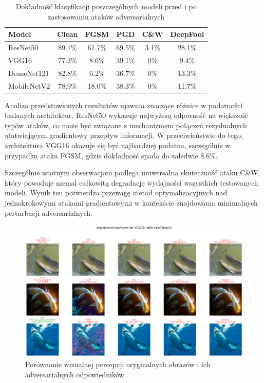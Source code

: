 \documentclass[12pt]{article}
\begin{document}
\begin{table}[H]
    \centering
    \begin{tabular}{|l|c|c|c|c|c|}
    \hline
    \textbf{Model} & \textbf{Clean} & \textbf{FGSM} & \textbf{PGD} & \textbf{C\&W} & \textbf{DeepFool} \\
    \hline
    ResNet50 & 89.1\% & 61.7\% & 69.5\% & 3.1\% & 28.1\% \\
    VGG16 & 77.3\% & 8.6\% & 39.1\% & 0\% & 9.4\% \\
    DenseNet121 & 82.8\% & 6.2\% & 36.7\% & 0\% & 13.3\% \\
    MobileNetV2 & 78.9\% & 18.0\% & 38.3\% & 0\% & 11.7\% \\
    \hline
    \end{tabular}
    \caption{Dokładność klasyfikacji poszczególnych modeli przed i po zastosowaniu ataków adversarialnych}
    \label{tab:attack-results}
\end{table}

Analiza przedstawionych rezultatów ujawnia znaczące różnice w podatności badanych architektur. ResNet50 wykazuje najwyższą odporność na większość typów ataków, co może być związane z mechanizmem połączeń rezydualnych ułatwiającym gradientowy przepływ informacji. W przeciwieństwie do tego, architektura VGG16 okazuje się być najbardziej podatna, szczególnie w przypadku ataku FGSM, gdzie dokładność spada do zaledwie 8.6\%.

Szczególnie istotnym obserwacjom podlega uniwersalna skuteczność ataku C\&W, który powoduje niemal całkowitą degradację wydajności wszystkich testowanych modeli. Wynik ten potwierdza przewagę metod optymalizacyjnych nad jednokrokowymi atakami gradientowymi w kontekście znajdowania minimalnych perturbacji adversarialnych.

\begin{figure}[H]
    \centering
    \includegraphics[width=1\textwidth]{adversarial_examples.png}
    \caption{Porównanie wizualnej percepcji oryginalnych obrazów i ich adversarialnych odpowiedników}
    \label{fig:adversarial-examples}
\end{figure}
\end{document}

